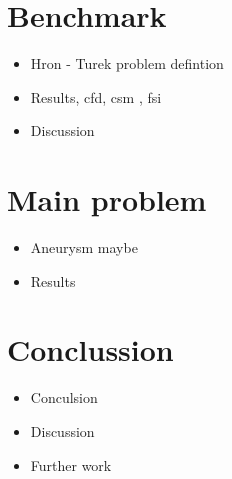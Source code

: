 \section{Benchmark}
\begin{itemize}
\item Hron - Turek problem defintion
\item Results, cfd, csm , fsi
\item Discussion 
\end{itemize}

\section{Main problem}
\begin{itemize}
\item Aneurysm maybe
\item Results
\end{itemize}

\section{Conclussion}
\begin{itemize}
\item Conculsion
\item Discussion
\item Further work 
\end{itemize}




